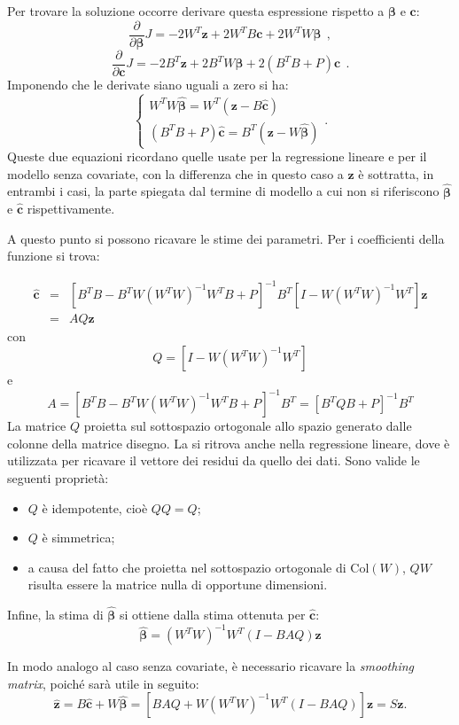 \documentclass[a4paper,11pt,twoside,openright]{book}							%
\begin{document}
Per trovare la soluzione occorre derivare questa espressione rispetto a $\bm \beta$ e $\bm c$:
$$
\frac{\partial}{\partial \bm \beta}J= -2W^T \bm z + 2W^T B \bm c + 2 W^TW \bm \beta \ \ ,
$$
$$
\frac{\partial}{\partial \bm c}J= -2 B^T \bm z + 2 B^T W \bm \beta + 2(B^T B + P) \bm c \ \ .
$$
Imponendo che le derivate siano uguali a zero si ha:
$$
\begin{cases}
W^TW \hat{\bm \beta} = W^T(\bm z - B \hat{\bm c})  \\
(B^T B + P) \hat{\bm c}=B^T(\bm z -W \hat{\bm \beta})
\end{cases}.
$$
Queste due equazioni ricordano quelle usate per la regressione lineare e per il modello senza covariate, con la differenza che in questo caso a $\bm z$ è sottratta, in entrambi i casi, la parte spiegata dal termine di modello a cui non si riferiscono $\hat{\bm \beta}$ e $\hat{\bm c}$ rispettivamente.

A questo punto si possono ricavare le stime dei parametri. Per i coefficienti della funzione si trova:

\begin{eqnarray}
 \label{eq:syscovar1}
\hat  {\bm c} &=& [B^TB-B^TW(W^TW)^{-1}W^TB+P]^{-1}B^T[I-W(W^TW)^{-1}W^T]\bm z  \nonumber \\
 &=& AQ \bm z
\end{eqnarray} 
con
$$
Q=[I-W(W^TW)^{-1}W^T]
$$
e
$$
A=[B^TB-B^TW(W^TW)^{-1}W^TB+P]^{-1}B^T=[B^TQB+P]^{-1}B^T
$$
La matrice $Q$ proietta sul sottospazio ortogonale allo spazio generato dalle colonne della matrice disegno. La si ritrova anche nella regressione lineare, dove è utilizzata per ricavare il vettore dei residui da quello dei dati. Sono valide le seguenti proprietà:
\begin{itemize}
\item $Q$ è idempotente, cioè $QQ=Q$;
\item $Q$ è simmetrica;
\item a causa del fatto che proietta nel sottospazio ortogonale di $\mathrm{Col}(W)$, $QW$ risulta essere la matrice nulla di opportune dimensioni. 
\end{itemize}
Infine, la stima di $\hat  {\bm \beta}$ si ottiene dalla stima ottenuta per $\hat  {\bm c}$:
\begin{equation}
\label{eq:syscovar2}
\hat{\bm{\beta}}=(W^TW)^{-1}W^T(I-B AQ)\bm z
\end{equation}

In modo analogo al caso senza covariate, è necessario ricavare la \textit{smoothing matrix}, poiché sarà utile in seguito:
$$
\hat  {\bm z} =B\hat  {\bm c} + W \hat  {\bm \beta} = [B AQ + W(W^TW)^{-1}W^T(I-B AQ)]\bm z = S\bm z .
$$
\end{document}
